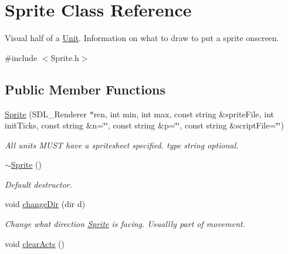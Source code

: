 \hypertarget{class_sprite}{}\section{Sprite Class Reference}
\label{class_sprite}


Visual half of a \hyperlink{class_unit}{Unit}. Information on what to draw to put a sprite onscreen.  




{\ttfamily \#include $<$Sprite.\+h$>$}

\subsection*{Public Member Functions}
\begin{DoxyCompactItemize}
\item 
\hyperlink{class_sprite_a326bb7f3050e11b3ea1bd77802c4a6df}{Sprite} (S\+D\+L\+\_\+\+Renderer $\ast$ren, int min, int max, const string \&sprite\+File, int init\+Ticks, const string \&n=\char`\"{}\char`\"{}, const string \&p=\char`\"{}\char`\"{}, const string \&script\+File=\char`\"{}\char`\"{})\hypertarget{class_sprite_a326bb7f3050e11b3ea1bd77802c4a6df}{}\label{class_sprite_a326bb7f3050e11b3ea1bd77802c4a6df}

\begin{DoxyCompactList}\small\item\em All units M\+U\+ST have a spritesheet specified. type string optional. \end{DoxyCompactList}\item 
\hyperlink{class_sprite_a8accab430f9d90ae5117b57d67e32b84}{$\sim$\+Sprite} ()\hypertarget{class_sprite_a8accab430f9d90ae5117b57d67e32b84}{}\label{class_sprite_a8accab430f9d90ae5117b57d67e32b84}

\begin{DoxyCompactList}\small\item\em Default destructor. \end{DoxyCompactList}\item 
void \hyperlink{class_sprite_a3eadf6ba2634a886862b6e2d9ca93b17}{change\+Dir} (dir d)\hypertarget{class_sprite_a3eadf6ba2634a886862b6e2d9ca93b17}{}\label{class_sprite_a3eadf6ba2634a886862b6e2d9ca93b17}

\begin{DoxyCompactList}\small\item\em Change what direction \hyperlink{class_sprite}{Sprite} is facing. Usuallly part of movement. \end{DoxyCompactList}\item 
void \hyperlink{class_sprite_ad22d9f033c1414853cc3063ceae24598}{clear\+Acts} ()\hypertarget{class_sprite_ad22d9f033c1414853cc3063ceae24598}{}\label{class_sprite_ad22d9f033c1414853cc3063ceae24598}


\end{DoxyCompactItemize}

